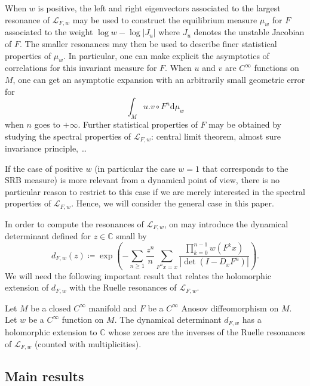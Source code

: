 \documentclass[AHL,Unicode,longabstracts,published]{cedram}
\newcommand{\p}[1]{\left(#1\right)}
\newcommand{\va}[1]{\left|#1\right|}
\newcommand{\clL}{\mathcal{L}}
\newcommand{\bbC}{\mathbb{C}}
\newcommand{\rmd}{\mathrm{d}}
\begin{document}
When $w$ is positive, the left and right eigenvectors associated to the largest resonance of $\clL_{F,w}$ may be used to construct the equilibrium measure $\mu_w$ for $F$ associated to the weight $\log w - \log |J_u|$ where $J_u$ denotes the unstable Jacobian of $F$. The smaller resonances may then be used to describe finer statistical properties of $\mu_w$. In particular, one can make explicit the asymptotics of correlations for this invariant measure for $F$. When $u$ and $v$ are $C^\infty$ functions on $M$, one can get an asymptotic expansion with an arbitrarily small geometric error for
\begin{equation*}
\int_M u. v \circ F^n \rmd \mu_w
\end{equation*}
when $n$ goes to $+ \infty$. Further statistical properties of $F$ may be obtained by studying the spectral properties of $\clL_{F,w}$: central limit theorem, almost sure invariance principle, \dots

If the case of positive $w$ (in particular the case $w = 1$ that corresponds to the SRB measure) is more relevant from a dynamical point of view, there is no particular reason to restrict to this case if we are merely interested in the spectral properties of $\clL_{F,w}$. Hence, we will consider the general case in this paper.

In order to compute the resonances of $\clL_{F,w}$, on may introduce the dynamical determinant defined for $z \in \bbC$ small by
\begin{equation}\label{eq:dynamical_determinant}
d_{F,w}(z) \coloneqq \exp\p{ - \sum_{n\geq1} \frac{z^n}{n} \sum_{F^n x = x} \frac{\prod_{k = 0}^{n-1} w\left(F^k x\right)}{\va{\det\p{ I - D_x F^n}}}}.
\end{equation}
We will need the following important result that relates the holomorphic extension of $d_{F,w}$ with the Ruelle resonances of $\clL_{F,w}$.

\begin{theo}\label{theorem:determinant}
Let $M$ be a closed $C^\infty$ manifold and $F$ be a $C^\infty$ Anosov diffeomorphism on $M$. Let $w$ be a $C^\infty$ function on $M$. The dynamical determinant $d_{F,w}$ has a holomorphic extension to $\bbC$ whose zeroes are the inverses of the Ruelle resonances of $\clL_{F,w}$ (counted with multiplicities).
\end{theo}

\subsection{Main results}
\end{document}
